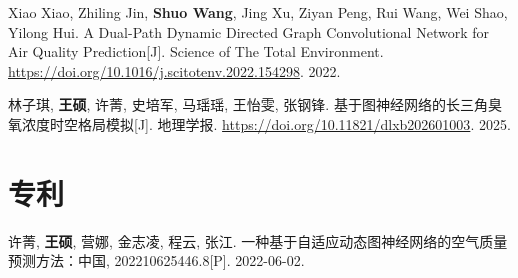 \begin{resume}
\begin{achievements}
    \item Xiao Xiao, Zhiling Jin, \textbf{Shuo Wang}, Jing Xu, Ziyan Peng, Rui Wang, Wei Shao, Yilong Hui. A Dual-Path Dynamic Directed Graph Convolutional Network for Air Quality Prediction[J]. Science of The Total Environment. \url{https://doi.org/10.1016/j.scitotenv.2022.154298}. 2022.
    \item 林子琪, \textbf{王硕}, 许菁, 史培军, 马瑶瑶, 王怡雯, 张钢锋. 基于图神经网络的长三角臭氧浓度时空格局模拟[J]. 地理学报. \url{https://doi.org/10.11821/dlxb202601003}. 2025.
  \end{achievements}

  \section*{专利}

  \begin{achievements}
    \item 许菁, \textbf{王硕}, 营娜, 金志凌, 程云, 张江. 一种基于自适应动态图神经网络的空气质量预测方法：中国, 202210625446.8[P]. 2022-06-02.
  \end{achievements}

\end{resume}
